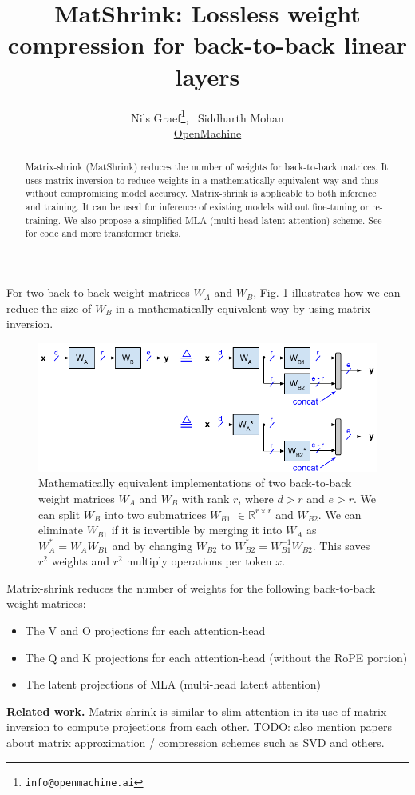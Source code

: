 \documentclass{article}
\title{MatShrink: Lossless weight compression for back-to-back linear layers}
\author{Nils Graef\thanks{\texttt{info@openmachine.ai}}, \, Siddharth Mohan \\
  \href{https://openmachine.ai}{OpenMachine}}
\newcommand{\eR}[2]{$\in \mathbb{R}^{#1 \times #2}$}  %
\begin{document}
 \maketitle

\begin{abstract}
Matrix-shrink (MatShrink) reduces the number of weights for back-to-back matrices. It uses matrix inversion to reduce weights in a mathematically equivalent way and thus without compromising model accuracy. Matrix-shrink is applicable to both inference and training. It can be used for inference of existing models without fine-tuning or re-training. We also propose a simplified MLA (multi-head latent attention) scheme. See \citep{tricks} for code and more transformer tricks.
\end{abstract}

For two back-to-back weight matrices $W_A$ and $W_B$, Fig. \ref{fig1} illustrates how we can reduce the size of $W_B$ in a mathematically equivalent way by using matrix inversion.
\begin{figure}[h!] \centering  %
  \includegraphics[scale=0.88]{../doc/fig/matShrink_fig1.pdf}
  \caption{Mathematically equivalent implementations of two back-to-back weight matrices $W_A$ and $W_B$ with rank $r$, where $d > r$ and $e > r$. We can split $W_B$ into two submatrices $W_{B1}$ \eR{r}{r} and $W_{B2}$. We can eliminate $W_{B1}$ if it is invertible by merging it into $W_A$ as $W_A^\ast = W_A W_{B1}$ and by changing $W_{B2}$ to $W_{B2}^\ast = W_{B1}^{-1} W_{B2}$. This saves $r^2$ weights and $r^2$ multiply operations per token $x$.}
\label{fig1} \end{figure}

Matrix-shrink reduces the number of weights for the following back-to-back weight matrices:

\begin{itemize}[topsep=-1pt, itemsep=-1pt]
  \item The V and O projections for each attention-head
  \item The Q and K projections for each attention-head (without the RoPE portion)
  \item The latent projections of MLA (multi-head latent attention)
\end{itemize}
\textbf{Related work.} Matrix-shrink is similar to slim attention \citep{slimAttn} in its use of matrix inversion to compute projections from each other. TODO: also mention papers about matrix approximation / compression schemes such as SVD and others.
\end{document}
